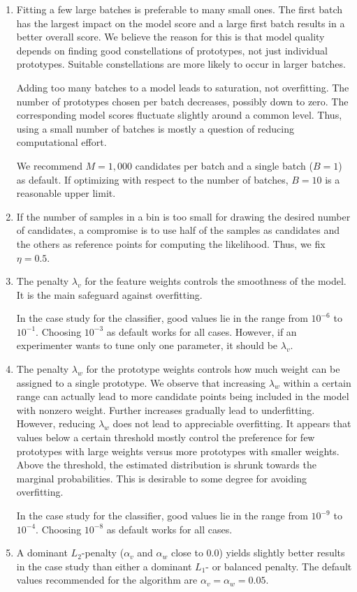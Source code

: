 \begin{enumerate}
\item Fitting a few large batches is preferable to many small ones.
The first batch has the largest impact on the model score and a large first batch results in a better overall score.
We believe the reason for this is that model quality depends on finding good constellations of prototypes, not just individual prototypes.
Suitable constellations are more likely to occur in larger batches.\par
%
Adding too many batches to a model leads to saturation, not overfitting.
The number of prototypes chosen per batch decreases, possibly down to zero.
The corresponding model scores fluctuate slightly around a common level.
Thus, using a small number of batches is mostly a question of reducing computational effort.\par
%
We recommend $M=1,000$ candidates per batch and a single batch ($B=1$) as default.
If optimizing with respect to the number of batches, $B=10$ is a reasonable upper limit.
%
\item If the number of samples in a bin is too small for drawing the desired number of candidates, a compromise is to use half of the samples as candidates and the others as reference points for computing the likelihood.
Thus, we fix $\eta=0.5$.
%
\item The penalty $\lambda_v$ for the feature weights controls the smoothness of the model.
It is the main safeguard against overfitting.\par
%
In the case study for the classifier, good values lie in the range from $10^{-6}$ to $10^{-1}$.
Choosing $10^{-3}$ as default works for all cases.
However, if an experimenter wants to tune only one parameter, it should be $\lambda_v$.
%
\item The penalty $\lambda_w$ for the prototype weights controls how much weight can be assigned to a single prototype.
We observe that increasing $\lambda_w$ within a certain range can actually lead to more candidate points being included in the model with nonzero weight.
Further increases gradually lead to underfitting.
However, reducing $\lambda_w$ does not lead to appreciable overfitting.
It appears that values below a certain threshold mostly control the preference for few prototypes with large weights versus more prototypes with smaller weights.
Above the threshold, the estimated distribution is shrunk towards the marginal probabilities.
This is desirable to some degree for avoiding overfitting.\par
%
In the case study for the classifier, good values lie in the range from $10^{-9}$ to $10^{-4}$.
Choosing $10^{-8}$ as default works for all cases.
%
\item A dominant $L_2$-penalty ($\alpha_v$ and $\alpha_w$ close to 0.0) yields slightly better results in the case study than either a dominant $L_1$- or balanced penalty.
The default values recommended for the algorithm are $\alpha_v=\alpha_w=0.05$.
\end{enumerate}
